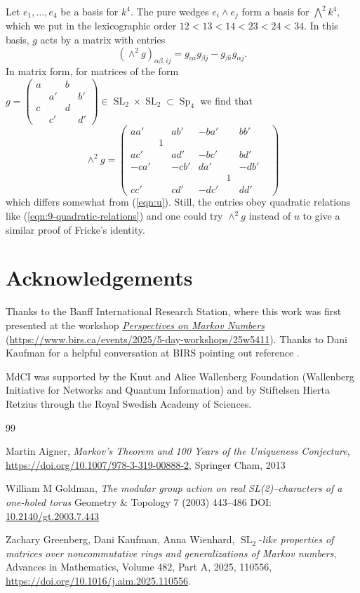 \documentclass[11pt]{amsart}
\theoremstyle{definition}
\numberwithin{figure}{section}
\numberwithin{equation}{section}
\numberwithin{table}{section}
\newcommand{\SL}{\operatorname{SL}}
\newcommand{\Sp}{\operatorname{Sp}}
\begin{document}
Let $e_1,\ldots,e_4$ be a basis for $k^4$.
The pure wedges $e_i \wedge e_j$ form a basis for $\bigwedge^2 k^4$, which we put in the lexicographic order $12<13<14<23<24<34$.
In this basis, $g$ acts by a matrix with entries
\[
(\wedge^2 g)_{\alpha \beta,ij} = g_{\alpha i}g_{\beta j}-g_{\beta i}g_{\alpha j}
.
\]
In matrix form, for matrices of the form
$
g=\begin{pmatrix} a & & b & \\ & a' & & b' \\ c & & d & \\ & c' & & d' \end{pmatrix}
\in \SL_2 \times \SL_2 \subset \Sp_4
$
we find that
\[
\wedge^2 g = \begin{pmatrix} aa' & & ab' & -ba' & & bb' \\
& 1 & & & & & \\
ac' & & ad' & -bc' & & bd' \\
-ca' & & -cb' & da' & & -db' \\
&&&& 1 & \\
cc' & & cd' & -dc' & & dd'
\end{pmatrix}
\]
which differs somewhat from (\ref{eqn:u}).
Still, the entries obey quadratic relations like (\ref{eqn:9-quadratic-relations}) and one could try $\wedge^2 g$ instead of $u$ to give a similar proof of Fricke's identity.

\section*{Acknowledgements}

Thanks to the Banff International Research Station, where this work was first presented at the workshop
\href{https://www.birs.ca/events/2025/5-day-workshops/25w5411}{\textit{Perspectives on Markov Numbers}} (\url{https://www.birs.ca/events/2025/5-day-workshops/25w5411}).
Thanks to Dani Kaufman for a helpful conversation at BIRS pointing out reference \cite{GKW}.

MdCI was supported by the Knut and Alice Wallenberg Foundation (Wallenberg Initiative for Networks and Quantum Information) and by Stiftelsen Hierta Retzius through the Royal Swedish Academy of Sciences.

\begin{thebibliography}{99}

 Martin Aigner, \emph{Markov's Theorem and 100 Years of the Uniqueness Conjecture}, \url{https://doi.org/10.1007/978-3-319-00888-2}, Springer Cham, 2013

 William M Goldman, \emph{The modular group action on real SL(2)–characters of a one-holed torus} Geometry \& Topology 7 (2003) 443–486 DOI: \url{10.2140/gt.2003.7.443}

 Zachary Greenberg, Dani Kaufman, Anna Wienhard,
$\SL_2$-\emph{like properties of matrices over noncommutative rings and generalizations of Markov numbers}, Advances in Mathematics,
Volume 482, Part A, 2025, 110556,
\url{https://doi.org/10.1016/j.aim.2025.110556}.
\end{thebibliography}
\end{document}
